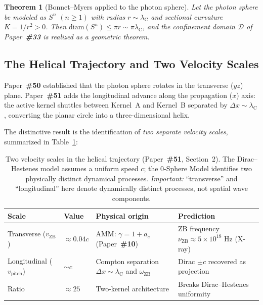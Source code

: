 \documentclass[12pt,letterpaper]{article}
\newcommand{\paperno}[1]{\textbf{\#{}#1}}
\newcommand{\vZB}{v_{\mathrm{ZB}}}
\newcommand{\lambdaC}{\lambda_{\mathrm{C}}}
\newtheorem{theorem}{Theorem}[section]
\begin{document}
\begin{theorem}[Bonnet--Myers applied to the photon sphere]
\label{thm:BM}
Let the photon sphere be modeled as $S^n$ $(n\geq 1)$ with radius
$r\sim\lambdaC$ and sectional curvature $K = 1/r^2 > 0$.
Then $\mathrm{diam}(S^n)\leq\pi r\sim\pi\lambdaC$,
and the confinement domain $\mathcal{D}$ of Paper~\paperno{33} is realized
as a geometric theorem.
\end{theorem}

\subsection{The Helical Trajectory and Two Velocity Scales}
\label{subsec:helix}

Paper~\paperno{50} established that the photon sphere rotates in the transverse ($yz$)
plane. Paper~\paperno{51} adds the longitudinal advance along the propagation ($x$) axis:
the active kernel shuttles between Kernel~A and Kernel~B separated by $\Delta x\sim\lambdaC$,
converting the planar circle into a three-dimensional helix.

The distinctive result is the identification of \emph{two separate velocity scales}, summarized in Table~\ref{tab:velocities}:

\begin{table}[h!]
\centering
\renewcommand{\arraystretch}{1.4}
\begin{tabular}{p{3.5cm}p{2.5cm}p{3.5cm}p{3.5cm}}
\toprule
\textbf{Scale} & \textbf{Value} & \textbf{Physical origin} & \textbf{Prediction} \\
\midrule
Transverse ($\vZB$) & $\approx 0.04c$ &
  AMM: $\gamma = 1 + a_e$ (Paper~\paperno{10}) &
  ZB frequency $\nu_{\mathrm{ZB}}\approx 5\times10^{18}$ Hz (X-ray) \\
\addlinespace[0.2cm]
Longitudinal ($v_{\mathrm{pitch}}$) & $\sim c$ &
  Compton separation $\Delta x\sim\lambdaC$ and $\omega_{\mathrm{ZB}}$ &
  Dirac $\pm c$ recovered as projection \\
\addlinespace[0.2cm]
Ratio & $\approx 25$ & Two-kernel architecture & Breaks Dirac--Hestenes uniformity \\
\bottomrule
\end{tabular}
\caption{Two velocity scales in the helical trajectory (Paper~\paperno{51}, Section~2).
The Dirac--Hestenes model assumes a uniform speed $c$; the 0-Sphere Model identifies
two physically distinct dynamical processes.
\emph{Important:} ``transverse'' and ``longitudinal'' here denote
dynamically distinct processes, not spatial wave components.}
\label{tab:velocities}
\end{table}
\end{document}
